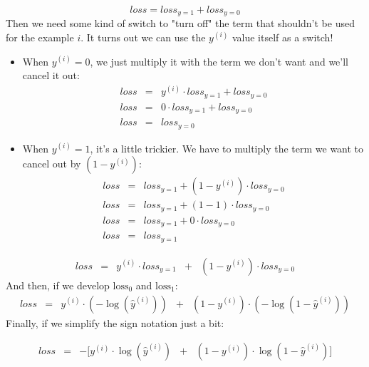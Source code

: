 $$
loss = loss_{y=1} + loss_{y=0}
$$
Then we need some kind of switch to "turn off" the term 
that shouldn't be used for the example $i$.
It turns out we can use the $y^{(i)}$ value itself as a switch! 
\begin{itemize}
    \item When $y^{(i)} = 0$, we just multiply it with the term we don't 
    want and we'll cancel it out:
          $$
          \begin{matrix}
          loss & = & y^{(i)} \cdot loss_{y=1} + loss_{y=0} \\
          loss & = & 0 \cdot loss_{y=1} + loss_{y=0} \\
          loss & = & loss_{y=0}
          \end{matrix}
          $$
    
    \item When $y^{(i)} = 1$, it's a little trickier. We have to multiply the term we want to cancel out by $(1 - y^{(i)})$:
          $$
          \begin{matrix}
          loss & = & loss_{y=1} + (1 - y^{(i)}) \cdot loss_{y=0} \\
          loss & = & loss_{y=1} + (1 - 1) \cdot loss_{y=0} \\
          loss & = & loss_{y=1} + 0 \cdot loss_{y=0}  \\
          loss & = & loss_{y=1}
          \end{matrix}
          $$
\end{itemize}

$$
\begin{matrix}
loss & = & y^{(i)} \cdot loss_{y=1} & + & (1 - y^{(i)}) \cdot loss_{y=0}
\end{matrix}
$$
And then, if we develop $\text{loss}_0$ and $\text{loss}_1$:
$$
\begin{matrix}
loss & = & y^{(i)} \cdot (-\log(\hat{y}^{(i)})) & + & (1 - y^{(i)}) \cdot (-\log(1 - \hat{y}^{(i)}))
\end{matrix}
$$
Finally, if we simplify the sign notation just a bit:

$$
\begin{matrix}
loss & = & -[y^{(i)}\cdot\log(\hat{y}^{(i)}) & + & (1 - y^{(i)})\cdot\log(1 - \hat{y}^{(i)})]
\end{matrix}
$$

